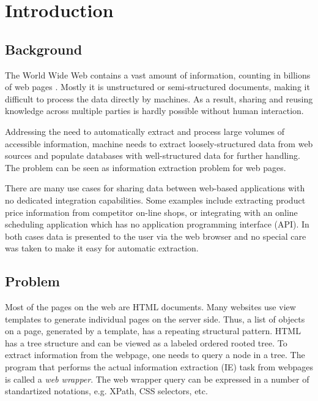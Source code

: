 \chapter{Introduction}


\section{Background} %
\label{sec:Problem}


The World Wide Web contains a vast amount of information, counting in billions of web pages \cite{signorini2005a}. Mostly it is unstructured or semi-structured documents, making it difficult to process the data directly by machines. As a result, sharing and reusing knowledge across multiple parties is hardly possible without human interaction.

Addressing the need to automatically extract and process large volumes of accessible information, machine needs to extract loosely-structured data from web sources and populate databases with well-structured data for further handling. The problem can be seen as information extraction problem for web pages. 

There are many use cases for sharing data between web-based applications with no dedicated integration capabilities. Some examples include extracting product price information from competitor on-line shops, or integrating with an online scheduling application which has no application programming interface (API). In both cases data is presented to the user via the web browser and no special care was taken to make it easy for automatic extraction.


\section{Problem}


Most of the pages on the web are HTML documents. Many websites use view templates to generate individual pages on the server side. Thus, a list of objects on a page, generated by a template, has a repeating structural pattern. HTML has a tree structure and can be viewed as a labeled ordered rooted tree. To extract information from the webpage, one needs to query a node in a tree. The program that performs the actual information extraction (IE) task from webpages is called a \emph{web wrapper}. The web wrapper query can be expressed in a number of standartized notations, e.g. XPath, CSS selectors, etc.

